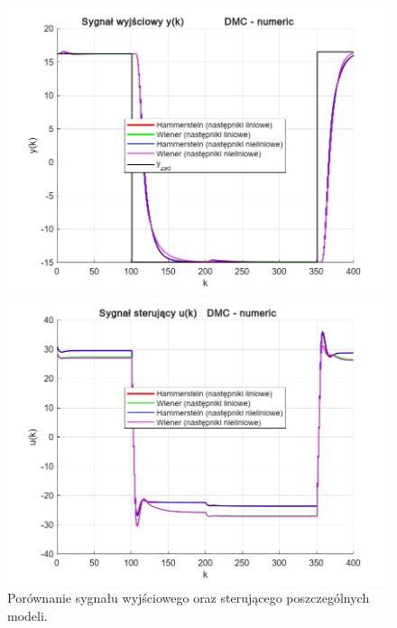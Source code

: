 \documentclass[a4paper,titlepage,11pt,floatssmall]{mwrep}
\begin{document}
\begin{figure}[p]
\centering
\begin{minipage}{0.495\linewidth}
    \centering
    \includegraphics[width=1.1\linewidth]{pictures/DMC_numeric_y}
\end{minipage}
\hfill
\begin{minipage}{0.495\linewidth}
    \centering
    \includegraphics[width=1.1\linewidth]{pictures/DMC_numeric_u}
\end{minipage}

\caption{Porównanie sygnału wyjściowego oraz sterującego poszczególnych modeli.}

\vspace{2cm} 


\end{figure}
\end{document}
